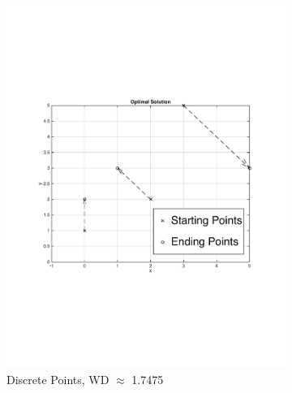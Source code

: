 \documentclass[10pt]{article}
\begin{document}
\begin{figure}[H]
\centering
\begin{subfigure}{.5\textwidth}
  \centering
  \includegraphics[scale = .49]{1st1DWD.pdf}
  \caption{Discrete Points, WD $\approx$ 1.7475}
  \label{fig: 1Ddiscreet}
\end{subfigure}%
\begin{subfigure}{.5\textwidth}
  \centering

\end{subfigure}
\end{figure}
\end{document}

